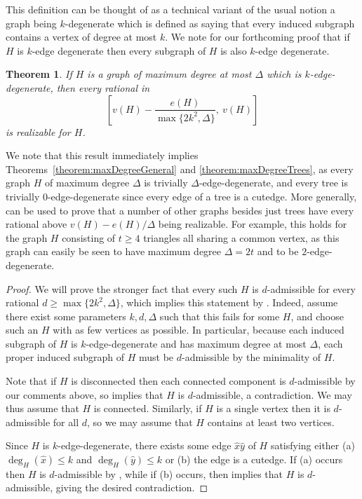 \documentclass[12pt,letterpaper]{article}
\newtheorem{theorem}{Theorem}[section]
\theoremstyle{definition}
\newcommand{\Del}{\Delta}
\begin{document}
	This definition can be thought of as a technical variant of the usual notion a graph being $k$-degenerate which is defined as saying that every induced subgraph contains a vertex of degree at most $k$.  We note for our forthcoming proof that if $H$ is $k$-edge degenerate then every subgraph of $H$ is also $k$-edge degenerate.
	
	\begin{theorem}\label{thm:degenerate}
		If $H$ is a graph of maximum degree at most $\Delta$ which is $k$-edge-degenerate, then every rational in
		\[
		\left[v(H)-\frac{e(H)}{\max\{2k^2,\Delta\}},\ v(H)\right]
		\]
		is realizable for $H$.
	\end{theorem}
	
	We note that this result immediately implies Theorems~\ref{theorem:maxDegreeGeneral} and \ref{theorem:maxDegreeTrees}, as every graph $H$ of maximum degree $\Delta$ is trivially $\Delta$-edge-degenerate, and every tree is trivially $0$-edge-degenerate since every edge of a tree is a cutedge.  More generally,  can be used to prove that a number of other graphs besides just trees have every rational above $v(H)-e(H)/\Delta$ being realizable.  For example, this holds for the graph $H$ consisting of $t\ge 4$ triangles all sharing a common vertex, as this graph can easily be seen to have maximum degree $\Delta=2t$ and to be $2$-edge-degenerate.
	
	\begin{proof}
		We will prove the stronger fact that every such $H$ is $d$-admissible for every rational $d\ge \max\{2k^2,\Delta\}$, which implies this statement by .  Indeed, assume there exist some parameters $k,d,\Delta$ such that this fails for some $H$, and choose such an $H$ with as few vertices as possible.  In particular, because each induced subgraph of $H$ is $k$-edge-degenerate and has maximum degree at most $\Del$, each proper induced subgraph of $H$ must be $d$-admissible by the minimality of $H$.
		
		Note that if $H$ is disconnected then each connected component is $d$-admissible by our comments above, so  implies that $H$ is $d$-admissible, a contradiction.  We may thus assume that $H$ is connected.  Similarly, if $H$ is a single vertex then it is $d$-admissible for all $d$, so we may assume that $H$ contains at least two vertices.
		
		Since $H$ is $k$-edge-degenerate, there exists some edge $\hat{x}\hat{y}$ of $H$ satisfying either (a) $\deg_H(\hat{x})\leq k$ and $\deg_H(\hat{y})\leq k$ or (b) the edge is a cutedge. If (a) occurs then $H$ is $d$-admissible by , while if (b) occurs, then  implies that $H$ is $d$-admissible, giving the desired contradiction.
	\end{proof}
	
\end{document}
